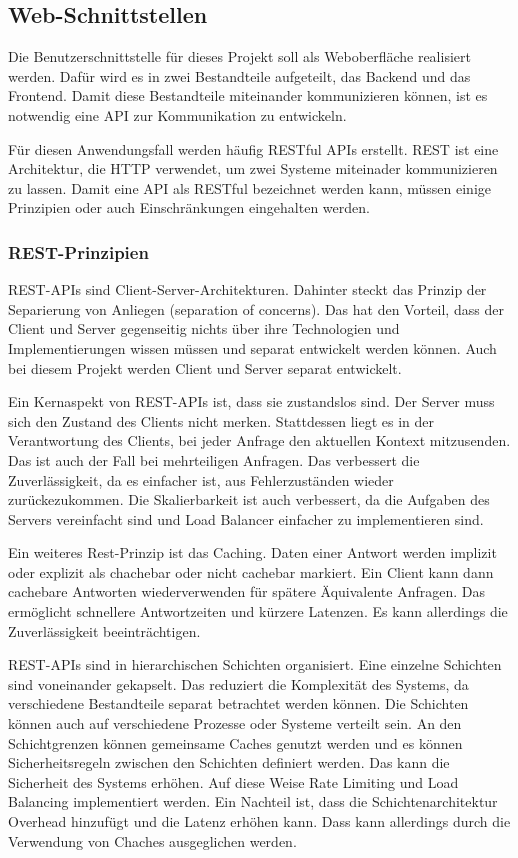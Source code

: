 \subsection{Web-Schnittstellen}
Die Benutzerschnittstelle für dieses Projekt soll als Weboberfläche realisiert werden. Dafür wird es in zwei Bestandteile aufgeteilt, das Backend und das Frontend. Damit diese Bestandteile miteinander kommunizieren können, ist es notwendig eine \ac{API} zur Kommunikation zu entwickeln.

Für diesen Anwendungsfall werden häufig \ac{REST}ful APIs erstellt. \ac{REST} ist eine Architektur, die HTTP verwendet, um zwei Systeme miteinader kommunizieren zu lassen. Damit eine API als \ac{REST}ful bezeichnet werden kann, müssen einige Prinzipien oder auch Einschränkungen eingehalten werden.

\subsubsection{REST-Prinzipien}

REST-APIs sind Client-Server-Architekturen. Dahinter steckt das Prinzip der Separierung von Anliegen (separation of concerns). Das hat den Vorteil, dass der Client und Server gegenseitig nichts über ihre Technologien und Implementierungen wissen müssen und separat entwickelt werden können. Auch bei diesem Projekt werden Client und Server separat entwickelt.

Ein Kernaspekt von REST-APIs ist, dass sie zustandslos sind. Der Server muss sich den Zustand des Clients nicht merken. Stattdessen liegt es in der Verantwortung des Clients, bei jeder Anfrage den aktuellen Kontext mitzusenden. Das ist auch der Fall bei mehrteiligen Anfragen. Das verbessert die Zuverlässigkeit, da es einfacher ist, aus Fehlerzuständen wieder zurückezukommen. Die Skalierbarkeit ist auch verbessert, da die Aufgaben des Servers vereinfacht sind und Load Balancer einfacher zu implementieren sind.

Ein weiteres Rest-Prinzip ist das Caching. Daten einer Antwort werden implizit oder explizit als chachebar oder nicht cachebar markiert. Ein Client kann dann cachebare Antworten wiederverwenden für spätere Äquivalente Anfragen. Das ermöglicht schnellere Antwortzeiten und kürzere Latenzen. Es kann allerdings die Zuverlässigkeit beeinträchtigen.

REST-APIs sind in hierarchischen Schichten organisiert. Eine einzelne Schichten sind voneinander gekapselt. Das reduziert die Komplexität des Systems, da verschiedene Bestandteile separat betrachtet werden können. Die Schichten können auch auf verschiedene Prozesse oder Systeme verteilt sein. An den Schichtgrenzen können gemeinsame Caches genutzt werden und es können Sicherheitsregeln zwischen den Schichten definiert werden. Das kann die Sicherheit des Systems erhöhen. Auf diese Weise Rate Limiting und Load Balancing implementiert werden. Ein Nachteil ist, dass die Schichtenarchitektur Overhead hinzufügt und die Latenz erhöhen kann. Dass kann allerdings durch die Verwendung von Chaches ausgeglichen werden.

